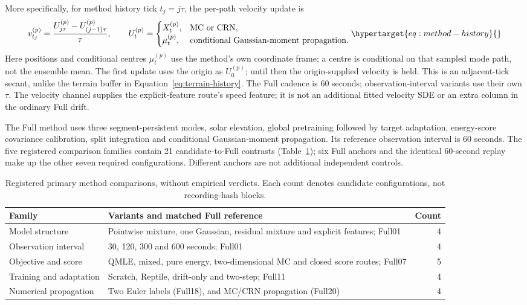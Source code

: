 More specifically, for method history tick \(t_j=j\tau\), the per-path
velocity update is
\begin{equation}
 v^{(p)}_{t_j}=\frac{U^{(p)}_{j\tau}-U^{(p)}_{(j-1)\tau}}{\tau},\qquad
 U^{(p)}_t=\begin{cases}
 X^{(p)}_t,&\text{MC or CRN},\\
 \mu^{(p)}_t,&\text{conditional Gaussian-moment propagation}.
 \end{cases}
 \label{eq:method-history}\hypertarget{eq:method-history}{}
\end{equation}
Here positions and conditional centres \(\mu^{(p)}_t\) use the method's own
coordinate frame; a centre is conditional on that sampled mode path, not the
ensemble mean. The first update uses the origin as \(U^{(p)}_0\); until then
the origin-supplied velocity is held. This is an adjacent-tick secant, unlike
the terrain buffer in Equation~\eqref{eq:terrain-history}. The Full cadence is
60 seconds; observation-interval variants use their own \(\tau\). The velocity
channel supplies the explicit-feature route's speed feature; it is not an
additional fitted velocity SDE or an extra column in the ordinary Full drift.

The Full method uses three segment-persistent modes, solar elevation, global
pretraining followed by target adaptation, energy-score covariance calibration,
split integration and conditional Gaussian-moment propagation. Its reference
observation interval is 60 seconds. The five registered comparison families
contain 21 candidate-to-Full contrasts (Table~\ref{tab:method-families}); six
Full anchors and the identical 60-second replay make up the other seven
required configurations. Different anchors are not additional independent controls.

\begin{table}[htbp]
\centering\small
\caption{Registered primary method comparisons, without empirical verdicts.
Each count denotes candidate configurations, not recording-hash blocks.}
\label{tab:method-families}\hypertarget{tab:method-families}{}
\begin{tabular}{p{.24\linewidth}p{.57\linewidth}r}
\hline
Family & Variants and matched Full reference & Count\\
\hline
Model structure & Pointwise mixture, one Gaussian, residual mixture and
explicit features; Full01 & 4\\
Observation interval & 30, 120, 300 and 600 seconds; Full01 & 4\\
Objective and score & QMLE, mixed, pure energy, two-dimensional MC and
closed score routes; Full07 & 5\\
Training and adaptation & Scratch, Reptile, drift-only and two-step;
Full11 & 4\\
Numerical propagation & Two Euler labels (Full18), and MC/CRN
propagation (Full20) & 4\\
\hline
\end{tabular}
\end{table}

